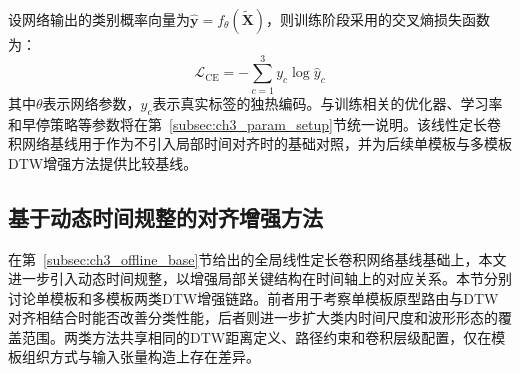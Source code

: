 \documentclass{xdupgthesis}
\begin{document}
设网络输出的类别概率向量为$\hat{\mathbf{y}}=f_{\theta}(\tilde{\mathbf{X}})$，则训练阶段采用的交叉熵损失函数为：
\begin{equation}
    \mathcal{L}_{\mathrm{CE}}=-\sum_{c=1}^{3} y_c \log \hat{y}_c
\end{equation}
其中$\theta$表示网络参数，$y_c$表示真实标签的独热编码。与训练相关的优化器、学习率和早停策略等参数将在第~\ref{subsec:ch3_param_setup}节统一说明。该线性定长卷积网络基线用于作为不引入局部时间对齐时的基础对照，并为后续单模板与多模板DTW增强方法提供比较基线。

\subsection{基于动态时间规整的对齐增强方法}
\label{subsec:ch3_dtw_def}

在第~\ref{subsec:ch3_offline_base}节给出的全局线性定长卷积网络基线基础上，本文进一步引入动态时间规整，以增强局部关键结构在时间轴上的对应关系\cite{ch3_sakoe1978dtw}。本节分别讨论单模板和多模板两类DTW增强链路。前者用于考察单模板原型路由与DTW对齐相结合时能否改善分类性能，后者则进一步扩大类内时间尺度和波形形态的覆盖范围。两类方法共享相同的DTW距离定义、路径约束和卷积层级配置，仅在模板组织方式与输入张量构造上存在差异。
\end{document}
